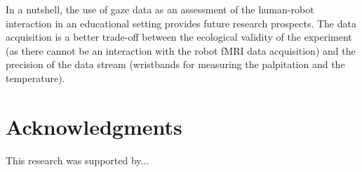 \documentclass{sig-alternate}
\begin{document}
In a nutshell, the use of gaze data as an assessment of the human-robot
interaction in an educational setting provides future research
prospects. The data acquisition is a better trade-off between the
ecological validity of the experiment (as there cannot be an interaction
with the robot fMRI data acquisition) and the precision of the data
stream (wristbands for measuring the palpitation and the temperature).



\section*{Acknowledgments}

This research was supported by...




\balancecolumns
\end{document}
